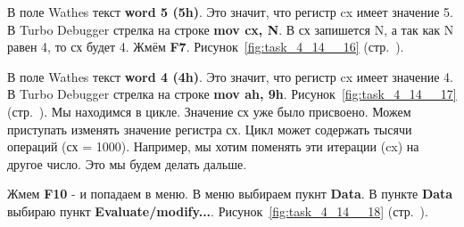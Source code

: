 В поле Wathes текст \textbf{word 5 (5h)}.
Это значит, что регистр cx имеет значение 5.
В Turbo Debugger стрелка на строке \textbf{mov cx, N}.
В сх запишется N, а так как N равен 4, то сх будет 4.
Жмём \textbf{F7}.
Рисунок~\ref{fig:task_4_14__16} (стр.~\pageref{fig:task_4_14__16}).

В поле Wathes текст \textbf{word 4 (4h)}.
Это значит, что регистр cx имеет значение 4.
В Turbo Debugger стрелка на строке \textbf{mov ah, 9h}.
Рисунок~\ref{fig:task_4_14__17} (стр.~\pageref{fig:task_4_14__17}).
Мы находимся в цикле.
Значение сх уже было присвоено.
Можем приступать изменять значение регистра сх.
Цикл может содержать тысячи операций (сх = 1000).
Например, мы хотим поменять эти итерации (cx) на другое число.
Это мы будем делать дальше.

Жмем \textbf{F10} - и попадаем в меню.
В меню выбираем пукнт \textbf{Data}.
В пункте \textbf{Data} выбираю пункт \textbf{Evaluate/modify...}.
Рисунок~\ref{fig:task_4_14__18} (стр.~\pageref{fig:task_4_14__18}).

